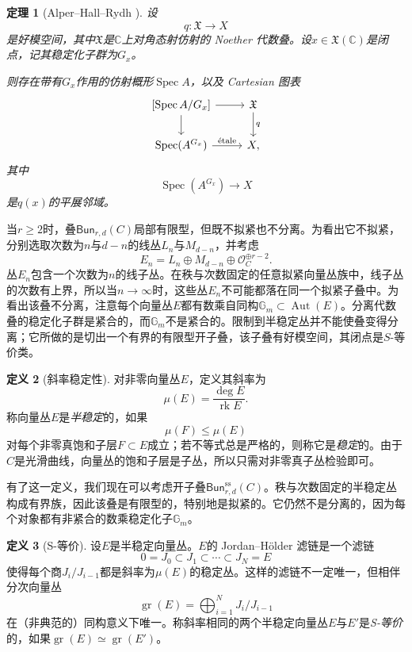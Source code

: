 \documentclass{amsart}
\newtheorem{thm}{定理}[section]
\theoremstyle{definition}
\newtheorem{defn}[thm]{定义}
\theoremstyle{remark}
\theoremstyle{plain}
\theoremstyle{definition}
\theoremstyle{remark}
\newcommand{\G}{\mathbb{G}}
\newcommand{\C}{\mathbb{C}}
\newcommand{\mc}[1]{\mathcal{#1}}
\newcommand{\mf}[1]{\mathfrak{#1}}
\newcommand{\mr}[1]{\mathrm{#1}}
\newcommand{\on}[1]{\operatorname{#1}}
\newcommand{\ms}[1]{\mathsf{#1}}
\newcommand{\1}{\mathbf{1}}
\newcommand{\2}{\mathbf{2}}
\newcommand{\3}{\mathbf{3}}
\begin{document}
\begin{thm}[Alper--Hall--Rydh {\cite{AHR2020}}]
    设
    \[
        q\colon \mf{X}\longrightarrow X
    \]
    是好模空间，其中\(\mf{X}\)是\(\C\)上对角态射仿射的 Noether 代数叠。设\(x\in\mf{X}(\C)\)是闭点，记其稳定化子群为\(G_x\)。

    则存在带有\(G_x\)作用的仿射概形\(\on{Spec}A\)，以及 Cartesian 图表
    \[
        \begin{tikzcd}
            {[\on{Spec}A/G_x]}
                \arrow[r]
                \arrow[d]
            & \mf{X}
                \arrow[d, "q"]
            \\
            \on{Spec}(A^{G_x})
                \arrow[r, "\mathrm{\acute{e}tale}"]
            & X,
        \end{tikzcd}
    \]
    其中
    \[
        \on{Spec}(A^{G_x})\longrightarrow X
    \]
    是\(q(x)\)的平展邻域。
\end{thm}

当\(r\geq 2\)时，叠\(\ms{Bun}_{r,d}(C)\)局部有限型，但既不拟紧也不分离。为看出它不拟紧，分别选取次数为\(n\)与\(d-n\)的线丛\(L_n\)与\(M_{d-n}\)，并考虑
\[
    E_n=L_n\oplus M_{d-n}\oplus\mc{O}_C^{\oplus r-2}.
\]
丛\(E_n\)包含一个次数为\(n\)的线子丛。在秩与次数固定的任意拟紧向量丛族中，线子丛的次数有上界，所以当\(n\to\infty\)时，这些丛\(E_n\)不可能都落在同一个拟紧子叠中。为看出该叠不分离，注意每个向量丛\(E\)都有数乘自同构\(\G_m\subset\on{Aut}(E)\)。分离代数叠的稳定化子群是紧合的，而\(\G_m\)不是紧合的。限制到半稳定丛并不能使叠变得分离；它所做的是切出一个有界的有限型开子叠，该子叠有好模空间，其闭点是\(S\)-等价类。

\begin{defn}[斜率稳定性]
    对非零向量丛\(E\)，定义其斜率为
    \[ \mu(E)=\frac{\deg E}{\on{rk}E}. \]
    称向量丛\(E\)是\textit{半稳定}的，如果
    \[ \mu(F)\leq\mu(E) \]
    对每个非零真饱和子层\(F\subset E\)成立；若不等式总是严格的，则称它是\textit{稳定}的。由于\(C\)是光滑曲线，向量丛的饱和子层是子丛，所以只需对非零真子丛检验即可。
\end{defn}

有了这一定义，我们现在可以考虑开子叠\(\ms{Bun}_{r,d}^{\mr{ss}}(C)\)。秩与次数固定的半稳定丛构成有界族，因此该叠是有限型的，特别地是拟紧的。它仍然不是分离的，因为每个对象都有非紧合的数乘稳定化子\(\G_m\)。

\begin{defn}[S-等价]
    设\(E\)是半稳定向量丛。\(E\)的 Jordan--H\"older 滤链是一个滤链
    \[ 0=J_0\subset J_1\subset\cdots\subset J_N=E \]
    使得每个商\(J_i/J_{i-1}\)都是斜率为\(\mu(E)\)的稳定丛。这样的滤链不一定唯一，但相伴分次向量丛
    \[
        \on{gr}(E)=\bigoplus_{i=1}^N J_i/J_{i-1}
    \]
    在（非典范的）同构意义下唯一。称斜率相同的两个半稳定向量丛\(E\)与\(E'\)是\textit{S-等价}的，如果\(\on{gr}(E)\simeq\on{gr}(E')\)。
\end{defn}
\end{document}
